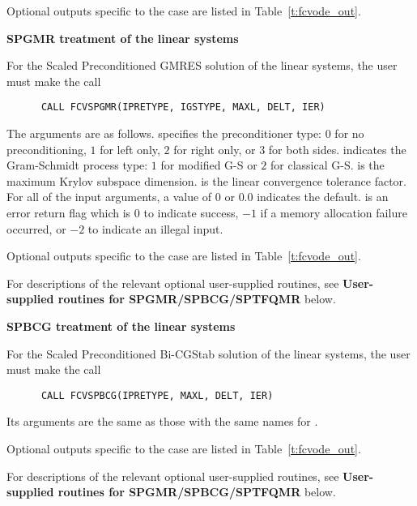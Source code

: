 \begin{Steps}
  Optional outputs specific to the {\band} case are listed in Table~\ref{t:fcvode_out}.

  
  {\s}{\p} {\bf SPGMR treatment of the linear systems}
  
  For the Scaled Preconditioned GMRES solution of the linear systems,
  the user must make the call
\begin{verbatim}
      CALL FCVSPGMR(IPRETYPE, IGSTYPE, MAXL, DELT, IER)
\end{verbatim}
  The arguments are as follows.
   specifies the preconditioner type: 
  $0$ for no preconditioning, $1$ for left only, $2$ for right only, or $3$ for
  both sides.  indicates the Gram-Schmidt process type: 
  $1$ for modified G-S or $2$ for classical G-S.
   is the maximum Krylov subspace dimension.
   is the linear convergence tolerance factor.
  For all of the input arguments, a value of $0$ or $0.0$ indicates the default.
   is an error return flag which is $0$ to indicate success, $-1$
  if a memory allocation failure occurred, or $-2$ to indicate an illegal input.
  
  Optional outputs specific to the {\spgmr} case are listed in
  Table~\ref{t:fcvode_out}.

  For descriptions of the relevant optional user-supplied routines, see 
  {\bf User-supplied routines for SPGMR/SPBCG/SPTFQMR} below.
  
  
  {\s}{\p} {\bf SPBCG treatment of the linear systems}
  
  For the Scaled Preconditioned Bi-CGStab solution of the linear systems,
  the user must make the call
\begin{verbatim}
      CALL FCVSPBCG(IPRETYPE, MAXL, DELT, IER)
\end{verbatim}
  Its arguments are the same as those with the same names for .

  Optional outputs specific to the {\spbcg} case are listed in
  Table~\ref{t:fcvode_out}.

  For descriptions of the relevant optional user-supplied routines, see 
  {\bf User-supplied routines for SPGMR/SPBCG/SPTFQMR} below.
  

\end{Steps}
